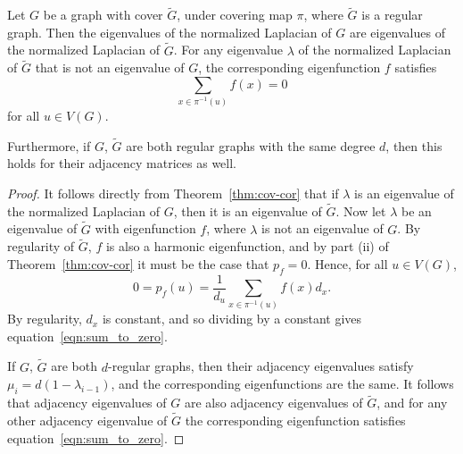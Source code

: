 \begin{corollary}\label{cor:cov-cor}
  Let $G$ be a graph with cover $\tilde{G}$, under covering map $\pi$,
  where $\tilde{G}$ is a regular graph.  Then the eigenvalues of
  the normalized Laplacian of $G$ are eigenvalues of the normalized Laplacian
  of $\tilde{G}$.  For any eigenvalue $\lambda$ of the normalized Laplacian
  of $\tilde{G}$ that is not an eigenvalue of $G$, the corresponding eigenfunction
  $f$ satisfies
 \begin{equation}\label{eqn:sum_to_zero}
  \sum_{x \in \pi^{-1}(u)} f(x) = 0
 \end{equation}
 for all $u \in V(G)$.


 Furthermore, if $G$, $\tilde{G}$ are both regular graphs with the
 same degree $d$, then this holds
 for their adjacency matrices as well. 
\end{corollary}
\begin{proof}
  It follows directly from Theorem~\ref{thm:cov-cor} that if $\lambda$ is an eigenvalue
  of the normalized Laplacian of $G$, then it is an eigenvalue of $\tilde{G}$.  Now
  let $\lambda$ be an eigenvalue of $\tilde{G}$ with eigenfunction $f$, where $\lambda$
  is not an eigenvalue of $G$.  By regularity
  of $\tilde{G}$, $f$ is also a harmonic eigenfunction, and by part (ii) of Theorem~\ref{thm:cov-cor}
  it must be the case that $p_f = 0$.  Hence, for all $u \in V(G)$,
  \[ 0 =  p_f(u) = \displaystyle \frac{1}{d_u} \sum_{x \in \pi^{-1}(u)} f(x) d_x .\]
  By regularity, $d_x$ is constant, and so dividing by a constant gives equation~\ref{eqn:sum_to_zero}.


  If $G$, $\tilde{G}$ are both $d$-regular graphs, then their adjacency eigenvalues satisfy
  $\mu_i = d(1-\lambda_{i-1})$, and the corresponding eigenfunctions are the same.  It follows
  that adjacency eigenvalues of $G$ are also adjacency eigenvalues of $\tilde{G}$, and for
  any other adjacency eigenvalue of $\tilde{G}$ the corresponding eigenfunction satisfies
  equation~\ref{eqn:sum_to_zero}.  
\end{proof}

